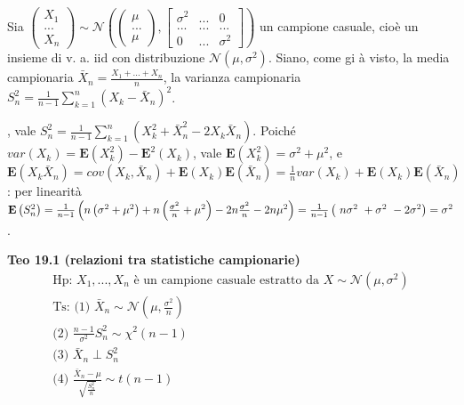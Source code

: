 \documentclass{article}
\begin{document}
Sia $\left( 
\begin{array}{c}
X_{1} \\ 
... \\ 
X_{n}%
\end{array}%
\right) \sim \mathcal{N}\left( \left( 
\begin{array}{c}
\mu \\ 
... \\ 
\mu%
\end{array}%
\right) ,\left[ 
\begin{array}{ccc}
\sigma ^{2} & ... & 0 \\ 
... & ... & ... \\ 
0 & ... & \sigma ^{2}%
\end{array}%
\right] \right) $ un campione casuale, cio\`{e} un insieme di v. a. iid con
distribuzione $\mathcal{N}\left( \mu ,\sigma ^{2}\right) $. Siano, come gi%
\`{a} visto, la media campionaria $\bar{X}_{n}=\frac{X_{1}+...+X_{n}}{n}$,
la varianza campionaria $S_{n}^{2}=\frac{1}{n-1}\sum_{k=1}^{n}\left( X_{k}-%
\bar{X}_{n}\right) ^{2}$.

, vale $S_{n}^{2}=\frac{1}{n-1}\sum_{k=1}^{n}\left( X_{k}^{2}+\bar{X}%
_{n}^{2}-2X_{k}\bar{X}_{n}\right) $. Poich\'{e} $var\left( X_{k}\right) =%
\mathbf{E}\left( X_{k}^{2}\right) -\mathbf{E}^{2}\left( X_{k}\right) $, vale 
$\mathbf{E}\left( X_{k}^{2}\right) =\sigma ^{2}+\mu ^{2}$, e $\mathbf{E}%
\left( X_{k}\bar{X}_{n}\right) =cov\left( X_{k},\bar{X}_{n}\right) +\mathbf{E%
}\left( X_{k}\right) \mathbf{E}\left( \bar{X}_{n}\right) =\frac{1}{n}%
var\left( X_{k}\right) +\mathbf{E}\left( X_{k}\right) \mathbf{E}\left( \bar{X%
}_{n}\right) $: per linearit\`{a} $\mathbf{E}\left( S_{n}^{2}\right) =\frac{1%
}{n-1}\left( n\left( \sigma ^{2}+\mu ^{2}\right) +n\left( \frac{\sigma ^{2}}{%
n}+\mu ^{2}\right) -2n\frac{\sigma ^{2}}{n}-2n\mu ^{2}\right) =\frac{1}{n-1}%
\left( \ n\sigma ^{2}\ +\sigma ^{2}\ -2\sigma ^{2}\right) =\sigma ^{2}$.

\textbf{Teo 19.1 (relazioni tra statistiche campionarie)}%
\begin{gather*}
\text{Hp: }X_{1},...,X_{n}\text{ \`{e} un campione casuale estratto da }%
X\sim \mathcal{N}\left( \mu ,\sigma ^{2}\right) \\
\text{Ts: (1) }\bar{X}_{n}\sim \mathcal{N}\left( \mu ,\frac{\sigma ^{2}}{n}%
\right) \\
\text{(2) }\frac{n-1}{\sigma ^{2}}S_{n}^{2}\sim \chi ^{2}\left( n-1\right) \\
\text{(3) }\bar{X}_{n}\perp S_{n}^{2} \\
\text{(4) }\frac{\bar{X}_{n}-\mu }{\sqrt{\frac{S_{n}^{2}}{n}}}\sim t\left(
n-1\right)
\end{gather*}
\end{document}
